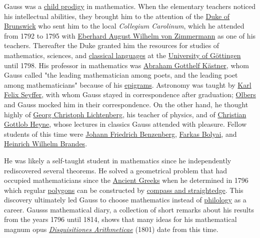 Gauss was a \href{https://en.wikipedia.org/wiki/Child_prodigy}{child prodigy} in mathematics. When the elementary teachers noticed his intellectual abilities, they brought him to the attention of the \href{https://en.wikipedia.org/wiki/Charles_William_Ferdinand,_Duke_of_Brunswick}{Duke of Brunswick} who sent him to the local \emph{Collegium Carolinum}, which he attended from 1792 to 1795 with \href{https://en.wikipedia.org/wiki/Eberhard_August_Wilhelm_von_Zimmermann}{Eberhard August Wilhelm von Zimmermann} as one of his teachers. Thereafter the Duke granted him the resources for studies of mathematics, sciences, and \href{https://en.wikipedia.org/wiki/Classics}{classical languages} at the \href{https://en.wikipedia.org/wiki/University_of_Göttingen}{University of Göttingen} until 1798. His professor in mathematics was \href{https://en.wikipedia.org/wiki/Abraham_Gotthelf_Kästner}{Abraham Gotthelf Kästner}, whom Gauss called "the leading mathematician among poets, and the leading poet among mathematicians" because of his \href{https://en.wikipedia.org/wiki/Epigram}{epigrams}. Astronomy was taught by \href{https://en.wikipedia.org/wiki/Karl_Felix_Seyffer}{Karl Felix Seyffer}, with whom Gauss stayed in correspondence after graduation; \href{https://en.wikipedia.org/wiki/Heinrich_Wilhelm_Matthias_Olbers}{Olbers} and Gauss mocked him in their correspondence. On the other hand, he thought highly of \href{https://en.wikipedia.org/wiki/Georg_Christoph_Lichtenberg}{Georg Christoph Lichtenberg}, his teacher of physics, and of \href{https://en.wikipedia.org/wiki/Christian_Gottlob_Heyne}{Christian Gottlob Heyne}, whose lectures in classics Gauss attended with pleasure. Fellow students of this time were \href{https://en.wikipedia.org/wiki/Johann_Friedrich_Benzenberg}{Johann Friedrich Benzenberg}, \href{https://en.wikipedia.org/wiki/Farkas_Bolyai}{Farkas Bolyai}, and \href{https://en.wikipedia.org/wiki/Heinrich_Wilhelm_Brandes}{Heinrich Wilhelm Brandes}.

He was likely a self-taught student in mathematics since he independently rediscovered several theorems. He solved a geometrical problem that had occupied mathematicians since the \href{https://en.wikipedia.org/wiki/Ancient_Greece}{Ancient Greeks} when he determined in 1796 which regular \href{https://en.wikipedia.org/wiki/Polygon}{polygons} can be constructed by \href{https://en.wikipedia.org/wiki/Compass_and_straightedge_constructions}{compass and straightedge}. This discovery ultimately led Gauss to choose mathematics instead of \href{https://en.wikipedia.org/wiki/Philology}{philology} as a career. Gauss\textquotesingle s mathematical diary, a collection of short remarks about his results from the years 1796 until 1814, shows that many ideas for his mathematical magnum opus \emph{\href{https://en.wikipedia.org/wiki/Disquisitiones_Arithmeticae}{Disquisitiones Arithmeticae}} (1801) date from this time.

